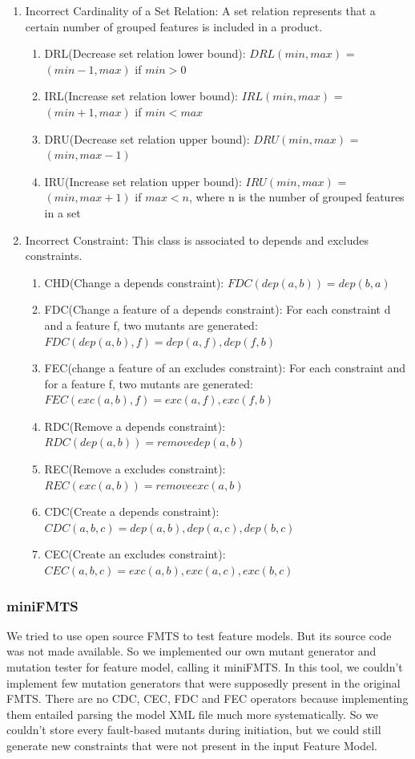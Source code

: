 \documentclass[a4paper,12pt]{article}
\begin{document}
\begin{enumerate}
\begin{enumerate}
    \end{enumerate}
    \item Incorrect Cardinality of a Set Relation: A set relation represents that a certain number of grouped features is included in a product.
    \begin{enumerate}
        \item DRL(Decrease set relation lower bound): $DRL(min, max)$ = $(min - 1, max)$ if $min > 0$
        \item IRL(Increase set relation lower bound): $IRL(min, max)$ = $(min + 1, max)$ if $min < max$
        \item DRU(Decrease set relation upper bound): $DRU(min, max)$ = $(min, max - 1)$
        \item IRU(Increase set relation upper bound): $IRU(min, max)$ = $(min, max + 1)$ if $max < n$, where n is the number of grouped features in a set
    \end{enumerate}
    \item Incorrect Constraint: This class is associated to depends and excludes constraints.
    \begin{enumerate}
        \item CHD(Change a depends constraint): $FDC(dep(a, b)) = dep(b, a)$
        \item FDC(Change a feature of a depends constraint): For each constraint d and a feature f, two mutants are generated: $FDC(dep(a, b), f) = dep(a, f), dep(f, b)$
        \item FEC(change a feature of an excludes constraint): For each constraint and for a feature f, two mutants are generated: $FEC(exc(a, b), f) = exc(a, f), exc(f, b)$
        \item RDC(Remove a depends constraint): $RDC(dep(a, b)) = remove dep(a, b)$
        \item REC(Remove a excludes constraint): $REC(exc(a, b)) = remove exc(a, b)$
        \item CDC(Create a depends constraint): $CDC(a, b, c) = dep(a, b), dep(a, c), dep(b, c)$
        \item CEC(Create an excludes constraint): $CEC(a, b, c) = exc(a, b), exc(a, c), exc(b, c)$
    \end{enumerate}
\end{enumerate} 
\subsubsection{miniFMTS}
We tried to use open source FMTS\cite{article} to test feature models. But its source code was not made available. So we implemented our own mutant generator and mutation tester for feature model, calling it  miniFMTS. In this tool, we couldn't implement few mutation generators that were supposedly present in the original FMTS. There are no CDC, CEC, FDC and FEC operators because implementing them entailed parsing the model XML file much more systematically. So we couldn't store every fault-based mutants during initiation, but we could still generate new constraints that were not present in the input Feature Model.
\end{document}
